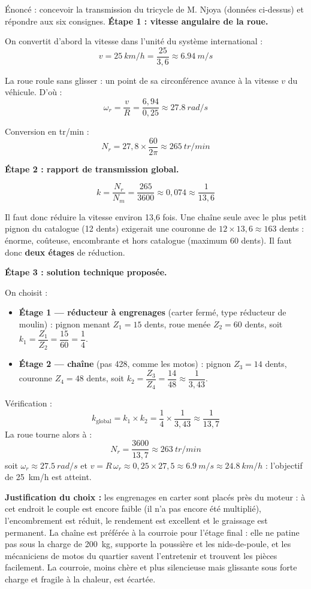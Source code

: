 \documentclass[11pt]{article}
\begin{document}
\begin{exoresolu}
Énoncé : concevoir la transmission du tricycle de M. Njoya (données ci-dessus) et répondre aux six consignes.
\tcblower
\textbf{Étape 1 : vitesse angulaire de la roue.}

On convertit d'abord la vitesse dans l'unité du système international :
\[
v = \SI{25}{km/h} = \frac{25}{3,6} \approx \SI{6,94}{m/s}
\]

La roue roule sans glisser : un point de sa circonférence avance à la vitesse $v$ du véhicule. D'où :
\[
\omega_r = \frac{v}{R} = \frac{6,94}{0,25} \approx \SI{27,8}{rad/s}
\]

Conversion en tr/min :
\[
N_r = 27,8 \times \frac{60}{2\pi} \approx \SI{265}{tr/min}
\]

\textbf{Étape 2 : rapport de transmission global.}

\[
k = \frac{N_r}{N_m} = \frac{265}{3600} \approx 0,074 \approx \frac{1}{13,6}
\]

Il faut donc réduire la vitesse environ 13,6 fois. Une chaîne seule avec le plus petit pignon du catalogue (12 dents) exigerait une couronne de $12 \times 13,6 \approx 163$ dents : énorme, coûteuse, encombrante et hors catalogue (maximum 60 dents). Il faut donc \textbf{deux étages} de réduction.

\textbf{Étape 3 : solution technique proposée.}

On choisit :
\begin{itemize}
\item \textbf{Étage 1 — réducteur à engrenages} (carter fermé, type réducteur de moulin) : pignon menant $Z_1 = 15$ dents, roue menée $Z_2 = 60$ dents, soit $k_1 = \dfrac{Z_1}{Z_2} = \dfrac{15}{60} = \dfrac{1}{4}$.
\item \textbf{Étage 2 — chaîne} (pas 428, comme les motos) : pignon $Z_3 = 14$ dents, couronne $Z_4 = 48$ dents, soit $k_2 = \dfrac{Z_3}{Z_4} = \dfrac{14}{48} \approx \dfrac{1}{3,43}$.
\end{itemize}

Vérification :
\[
k_{\text{global}} = k_1 \times k_2 = \frac{1}{4} \times \frac{1}{3,43} \approx \frac{1}{13,7}
\]
La roue tourne alors à :
\[
N_r = \frac{3600}{13,7} \approx \SI{263}{tr/min}
\]
soit $\omega_r \approx \SI{27,5}{rad/s}$ et $v = R\,\omega_r \approx 0,25 \times 27,5 \approx \SI{6,9}{m/s} \approx \SI{24,8}{km/h}$ : l'objectif de \SI{25}{km/h} est atteint.

\textbf{Justification du choix :} les engrenages en carter sont placés près du moteur : à cet endroit le couple est encore faible (il n'a pas encore été multiplié), l'encombrement est réduit, le rendement est excellent et le graissage est permanent. La chaîne est préférée à la courroie pour l'étage final : elle ne patine pas sous la charge de \SI{200}{kg}, supporte la poussière et les nids-de-poule, et les mécaniciens de motos du quartier savent l'entretenir et trouvent les pièces facilement. La courroie, moins chère et plus silencieuse mais glissante sous forte charge et fragile à la chaleur, est écartée.


\end{exoresolu}
\end{document}
